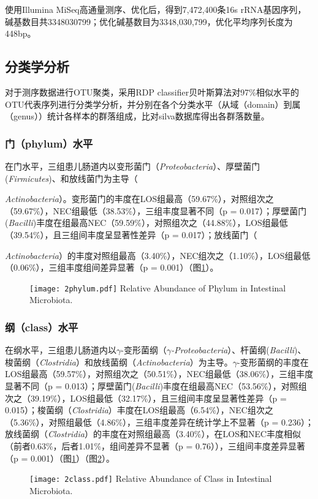   使用Illumina MiSeq高通量测序、优化后，得到7,472,400条16s rRNA基因序列，碱基数目共3348030799；优化碱基数目为3348,030,799，优化平均序列长度为448bp。
  \subsection{分类学分析}
  对于测序数据进行OTU聚类，采用RDP classifier贝叶斯算法对97\%相似水平的OTU代表序列进行分类学分析，并分别在各个分类水平（从域（domain）到属（genus））统计各样本的群落组成，比对silva数据库得出各群落数量。
    \subsubsection{门（phylum）水平}
    在门水平，三组患儿肠道内以变形菌门（\textit{Proteobacteria}）、厚壁菌门(\textit{Firmicutes})、和放线菌门为主导（{\textit{Actinobacteria}）。变形菌门的丰度在LOS组最高（59.67\%），对照组次之（59.67\%），NEC组最低（38.53\%），三组丰度显著不同（p = 0.017）；厚壁菌门(\textit{Bacilli})丰度在组最高NEC（59.59\%），对照组次之（44.88\%），LOS组最低（39.54\%），且三组间丰度呈显著性差异（p = 0.017）；放线菌门（{\textit{Actinobacteria}）的丰度对照组最高（3.40\%），NEC组次之（1.10\%），LOS组最低（0.06\%），三组丰度组间差异显著（p = 0.001）（图\ref{fig:2phylum}）。
      \begin{figure}[!htp]
        \centering
        \texttt{[image: 2phylum.pdf]}
          {Relative Abundance of Phylum in Intestinal Microbiota.}
        \label{fig:2phylum}
      \end{figure}

    \subsubsection{纲（class）水平}
    在纲水平，三组患儿肠道内以$\gamma$-变形菌纲（\textit{$\gamma$-Proteobacteria}）、杆菌纲(\textit{Bacilli})、梭菌纲（\textit{Clostridia}）和放线菌纲（\textit{Actinobacteria}）为主导。$\gamma$-变形菌纲的丰度在LOS组最高（59.57\%），对照组次之（50.51\%），NEC组最低（38.06\%），三组丰度显著不同（p = 0.013）；厚壁菌门(\textit{Bacilli})丰度在组最高NEC（53.56\%），对照组次之（39.19\%），LOS组最低（32.17\%），且三组间丰度呈显著性差异（p = 0.015）；梭菌纲（\textit{Clostridia}）丰度在LOS组最高（6.54\%），NEC组次之（5.36\%），对照组最低（4.86\%），三组丰度差异在统计学上不显著（p = 0.236）；放线菌纲（\textit{Clostridia}）的丰度在对照组最高（3.40\%），在LOS和NEC丰度相似（前者0.63\%，后者1.01\%，组间差异不显著（p = 0.76）），三组间丰度差异显著（p = 0.001）（图\ref{fig:2phylum}）（图\ref{fig:2class}）。
      \begin{figure}[!htp]
        \centering
        \texttt{[image: 2class.pdf]}
          {Relative Abundance of Class in Intestinal Microbiota.}
        \label{fig:2class}
      \end{figure}

}}
